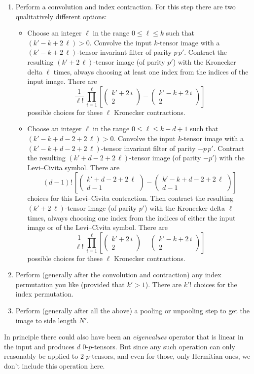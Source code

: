 \documentclass{article}
\theoremstyle{plain}
\renewcommand{\choose}[2]{\begin{pmatrix}{#1}\\{#2}\end{pmatrix}}
\begin{document}
\begin{enumerate}
    \item Perform a convolution and index contraction. For this step there are two qualitatively different options:
        \begin{itemize}
            \item Choose an integer $\ell$ in the range $0\leq\ell\leq k$ such that $(k'-k+2\,\ell)>0$.
              Convolve the input $k$-tensor image with a $(k'-k+2\,\ell)$-tensor invariant filter of parity $p\,p'$.
              Contract the resulting $(k'+2\,\ell)$-tensor image (of parity $p'$) with the Kronecker delta $\ell$ times, always choosing at least one index from the indices of the input image.
              There are $$\frac{1}{\ell!}\,\prod_{i=1}^{\ell}\left[\choose{k'+2\,i}{2}-\choose{k'-k+2\,i}{2}\right]$$ possible choices for these $\ell$ Kronecker contractions.
            \item Choose an integer $\ell$ in the range $0\leq\ell\leq k-d+1$ such that $(k'-k+d-2+2\,\ell)>0$.
              Convolve the input $k$-tensor image with a $(k'-k+d-2+2\,\ell)$-tensor invariant filter of parity $-p\,p'$.
              Contract the resulting $(k'+d-2+2\,\ell)$-tensor image (of parity $-p'$) with the Levi--Civita symbol.
              There are $$(d-1)!\,\left[\choose{k'+d-2+2\,\ell}{d-1}-\choose{k'-k+d-2+2\,\ell}{d-1}\right]$$ choices for this Levi--Civita contraction.
              Then contract the resulting $(k'+2\,\ell)$-tensor image (of parity $p'$) with the Kronecker delta $\ell$ times, always choosing one index from the indices of either the input image or of the Levi--Civita symbol.
              There are $$\frac{1}{\ell!}\,\prod_{i=1}^{\ell}\left[\choose{k'+2\,i}{2}-\choose{k'-k+2\,i}{2}\right]$$ possible choices for these $\ell$ Kronecker contractions.
        \end{itemize}
    \item Perform (generally after the convolution and contraction) any index permutation you like (provided that $k'>1$).
      There are $k'!$ choices for the index permutation.
    \item Perform (generally after all the above) a pooling or unpooling step to get the image to side length $N'$.
\end{enumerate}

In principle there could also have been an \emph{eigenvalues} operator that is linear in the input and produces $d$ $0$-$p$-tensors.
But since any such operation can only reasonably be applied to $2$-$p$-tensors, and even for those, only Hermitian ones, we don't include this operation here.
\end{document}
